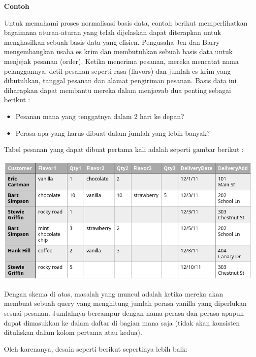 \documentclass[]{book}
\providecommand{\tightlist}{%
  \setlength{\itemsep}{0pt}\setlength{\parskip}{0pt}}
\begin{document}
\textbf{Contoh}

Untuk memahami proses normalisasi basis data, contoh berikut memperlihatkan bagaimana aturan-aturan yang telah dijelaskan dapat diterapkan untuk menghasilkan sebuah basis data yang efisien. Pengusaha Jen dan Barry mengembangkan usaha es krim dan membutuhkan sebuah basis data untuk menjejak pesanan (order). Ketika menerima pesanan, mereka mencatat nama pelanggannya, detil pesanan seperti rasa (flavors) dan jumlah es krim yang dibutuhkan, tanggal pesanan dan alamat pengiriman pesanan. Basis data ini diharapkan dapat membantu mereka dalam menjawab dua penting sebagai berikut :

\begin{itemize}
\tightlist
\item
  Pesanan mana yang tenggatnya dalam 2 hari ke depan?
\item
  Perasa apa yang harus dibuat dalam jumlah yang lebih banyak?
\end{itemize}

Tabel pesanan yang dapat dibuat pertama kali adalah seperti gambar berikut :

\includegraphics{./img/tab1_order.png}

Dengan skema di atas, masalah yang muncul adalah ketika mereka akan membuat sebuah query yang menghitung jumlah perasa vanilla yang diperlukan sesuai pesanan. Jumlahnya bercampur dengan nama perasa dan perasa apapun dapat dimasukkan ke dalam daftar di bagian mana saja (tidak akan konsisten dituliskan dalam kolom pertama atau kedua).

Oleh karenanya, desain seperti berikut sepertinya lebih baik:
\end{document}
